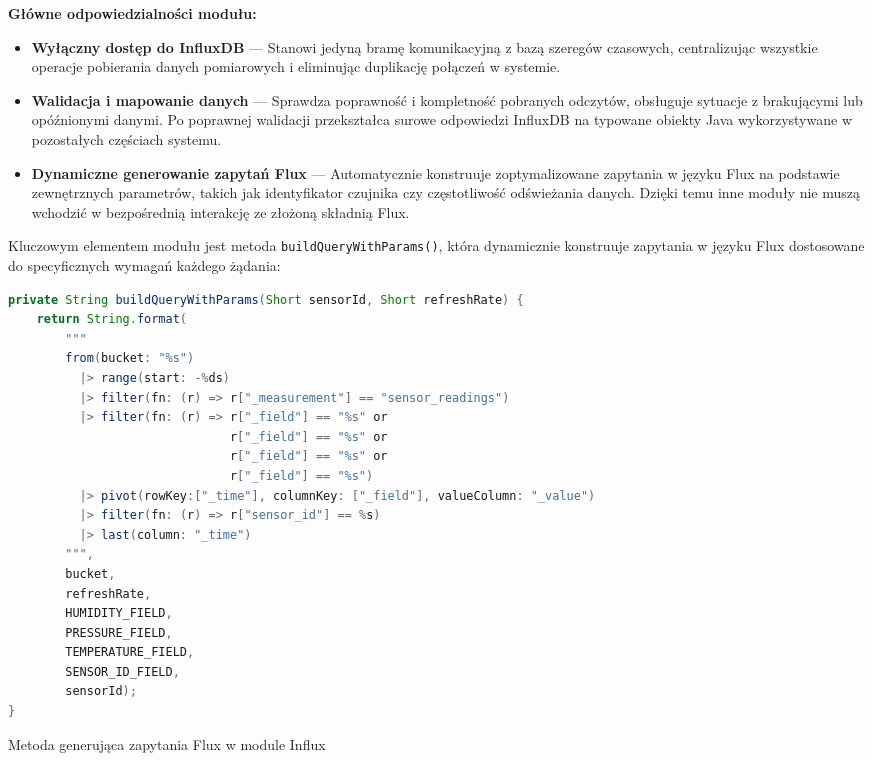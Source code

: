 \documentclass[a4paper,12pt,openany]{book}
\begin{document}
\vspace{0.5em}
\textbf{Główne odpowiedzialności modułu:}
\begin{itemize}[itemsep=2pt,topsep=4pt,parsep=0pt]
\item \textbf{Wyłączny dostęp do InfluxDB} --- Stanowi jedyną bramę komunikacyjną z bazą szeregów czasowych, centralizując wszystkie operacje pobierania danych pomiarowych i eliminując duplikację połączeń w systemie.

\item \textbf{Walidacja i mapowanie danych} --- Sprawdza poprawność i kompletność pobranych odczytów, obsługuje sytuacje z brakującymi lub opóźnionymi danymi. Po poprawnej walidacji przekształca surowe odpowiedzi InfluxDB na typowane obiekty Java wykorzystywane w pozostałych częściach systemu.

\item \textbf{Dynamiczne generowanie zapytań Flux} --- Automatycznie konstruuje zoptymalizowane zapytania w języku Flux na podstawie zewnętrznych parametrów, takich jak identyfikator czujnika czy częstotliwość odświeżania danych. Dzięki temu inne moduły nie muszą wchodzić w bezpośrednią interakcję ze złożoną składnią Flux.

\end{itemize}

\vspace{-0.4em}

Kluczowym elementem modułu jest metoda \texttt{buildQueryWithParams()}, która dynamicznie konstruuje zapytania w języku Flux dostosowane do specyficznych wymagań każdego żądania:

\begin{lstfloat}[H]
\begin{lstlisting}[language=java]
private String buildQueryWithParams(Short sensorId, Short refreshRate) {
    return String.format(
        """
        from(bucket: "%s")
          |> range(start: -%ds)
          |> filter(fn: (r) => r["_measurement"] == "sensor_readings")
          |> filter(fn: (r) => r["_field"] == "%s" or
                               r["_field"] == "%s" or
                               r["_field"] == "%s" or
                               r["_field"] == "%s")
          |> pivot(rowKey:["_time"], columnKey: ["_field"], valueColumn: "_value")
          |> filter(fn: (r) => r["sensor_id"] == %s)
          |> last(column: "_time")
        """,
        bucket,
        refreshRate,
        HUMIDITY_FIELD,
        PRESSURE_FIELD,
        TEMPERATURE_FIELD,
        SENSOR_ID_FIELD,
        sensorId);
}
\end{lstlisting}
\caption{Metoda generująca zapytania Flux w module Influx}
\label{lst:flux-query}
\end{lstfloat}
\end{document}
